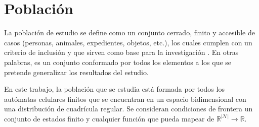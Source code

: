 \section{Población}

La población de estudio se define como un conjunto cerrado, finito y accesible de casos (personas, animales, expedientes, objetos, etc.), los cuales cumplen con un criterio de inclusión y que sirven como base para la investigación \cite{poblacion}. En otras palabras, es un conjunto conformado por todos los elementos a los que se pretende generalizar los resultados del estudio.

En este trabajo, la población que se estudia está formada por todos los autómatas celulares finitos que se encuentran en un espacio bidimensional con una distribución de cuadrícula regular. Se consideran condiciones de frontera un conjunto de estados finito y cualquier función que pueda mapear de $\mathbb{R}^{|\mathcal{N}|} \to \mathbb{R}$.

